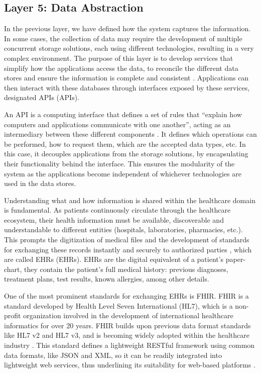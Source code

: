 \subsection{Layer 5: Data Abstraction}
\label{sec:iot-model-layer5}


In the previous layer, we have defined how the system captures the information. In some cases, the collection of data may require the development of multiple concurrent storage solutions, each using different technologies, resulting in a very complex environment. The purpose of this layer is to develop services that simplify how the applications access the data, to reconcile the different data stores and ensure the information is complete and consistent \cite{Cisco2014}. Applications can then interact with these databases through interfaces exposed by these services, designated \acl{API}s (\acs{API}s). \bigskip 

An \acs{API} is a computing interface that defines a set of rules that ``explain how computers and applications communicate with one another'', acting as an intermediary between these different components \cite{IBMAPI}. It defines which operations can be performed, how to request them, which are the accepted data types, etc. In this case, it decouples applications from the storage solutions, by encapsulating their functionality behind the interface. This ensures the modularity of the system as the applications become independent of whichever technologies are used in the data stores. \bigskip

Understanding what and how information is shared within the healthcare domain is fundamental. As patients continuously circulate through the healthcare ecosystem, their health information must be available, discoverable and understandable to different entities (hospitals, laboratories, pharmacies, etc.). This prompts the digitization of medical files and the development of standards for exchanging these records instantly and securely to authorized parties \cite{HL72019}, which are called \acl{EHR}s (\acs{EHR}s). \acs{EHR}s are the digital equivalent of a patient's paper-chart, they contain the patient's full medical history: previous diagnoses, treatment plans, test results, known allergies, among other details. \bigskip

One of the most prominent standards for exchanging \acs{EHR}s is \acf{FHIR}. \acs{FHIR} is a standard developed by Health Level Seven International (HL7), which is a non-profit organization involved in the development of international healthcare informatics for over 20 years. \acs{FHIR} builds upon previous data format standards like HL7 v2 and HL7 v3, and is becoming widely adopted within the healthcare industry \cite{Peng2019}. This standard defines a lightweight RESTful framework using common data formats, like JSON and XML, so it can be readily integrated into lightweight web services, thus underlining its suitability for web-based platforms \cite{Gruendner2019}.

